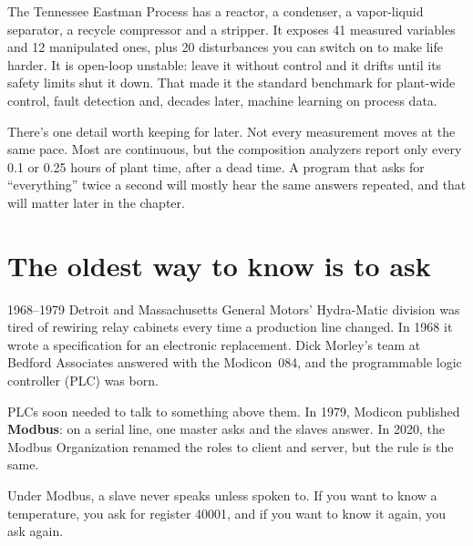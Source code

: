 The Tennessee Eastman Process has a reactor, a condenser, a vapor-liquid
separator, a recycle compressor and a stripper. It exposes 41 measured variables
and 12 manipulated ones, plus 20 disturbances you can switch on to make life
harder. It is open-loop unstable: leave it without control and it drifts until
its safety limits shut it down. That made it the standard benchmark for
plant-wide control, fault detection and, decades later, machine learning on
process data.

There's one detail worth keeping for later. Not every measurement moves at the
same pace. Most are continuous, but the composition analyzers report only every
0.1 or 0.25 hours of plant time, after a dead time. A program that asks for
``everything'' twice a second will mostly hear the same answers repeated, and
that will matter later in the chapter.

\section{The oldest way to know is to ask}

\begin{history}{1968--1979 \textperiodcentered{} Detroit and Massachusetts}
General Motors' Hydra-Matic division was tired of rewiring relay cabinets every
time a production line changed. In 1968 it wrote a specification for an
electronic replacement. Dick Morley's team at Bedford Associates answered with
the Modicon~084, and the programmable logic controller (PLC) was born.

PLCs soon needed to talk to something above them. In 1979, Modicon published
\textbf{Modbus}: on a serial line, one master asks and the slaves answer. In
2020, the Modbus Organization renamed the roles to client and server, but the
rule is the same.
\end{history}

Under Modbus, a slave never speaks unless spoken to. If you want to know a
temperature, you ask for register 40001, and if you want to know it again, you
ask again.

